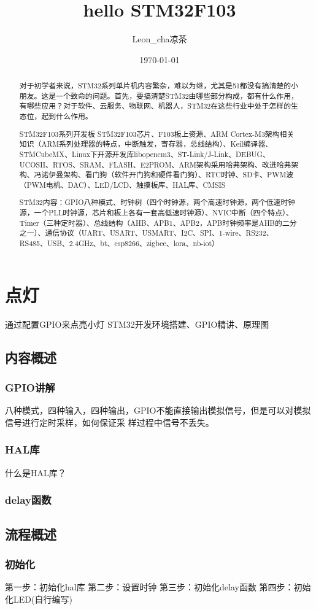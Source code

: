 \documentclass[UTF8]{ctexart}
\title{hello STM32F103}
\author{Leon_cha凉茶}
\date{\today}
\begin{document}
\begin{abstract}
对于初学者来说，STM32系列单片机内容繁杂，难以为继，尤其是51都没有搞清楚的小朋友。这是一个致命的问题。首先，要搞清楚STM32由哪些部分构成，都有什么作用，有哪些应用？对于软件、云服务、物联网、机器人，STM32在这些行业中处于怎样的生态位，起到什么作用。

STM32F103系列开发板
STM32F103芯片、F103板上资源、ARM Cortex-M3架构相关知识（ARM系列处理器的特点，中断触发，寄存器，总线结构）、Keil编译器、STMCubeMX、Linux下开源开发库libopencm3、ST-Link/J-Link、DEBUG、UCOSII、RTOS、SRAM、FLASH、E2PROM、ARM架构采用哈弗架构、改进哈弗架构、冯诺伊曼架构、看门狗（软件开门狗和硬件看门狗）、RTC时钟、SD卡、PWM波（PWM电机、DAC）、LED/LCD、触摸板库、HAL库、CMSIS

STM32内容：GPIO八种模式、时钟树（四个时钟源，两个高速时钟源，两个低速时钟源，一个PLL时钟源，芯片和板上各有一套高低速时钟源）、NVIC中断（四个特点）、Timer（三种定时器）、总线结构（AHB、APB1、APB2，APB时钟频率是AHB的二分之一）、通信协议（UART、USART、USMART、I2C、SPI、1-wire、RS232、RS485、USB、2.4GHz、bt、esp8266、zigbee、lora、nb-iot）
\end{abstract}



\section{点灯}
通过配置GPIO来点亮小灯
STM32开发环境搭建、GPIO精讲、原理图
\subsection{内容概述}
\subsubsection{GPIO讲解}
八种模式，四种输入，四种输出，GPIO不能直接输出模拟信号，但是可以对模拟信号进行定时采样，如何保证采
样过程中信号不丢失。
\subsubsection{HAL库}
什么是HAL库？
\subsubsection{delay函数}
\subsection{流程概述}
\subsubsection{初始化}
第一步：初始化hal库
第二步：设置时钟
第三步：初始化delay函数
第四步：初始化LED(自行编写)
\end{document}
